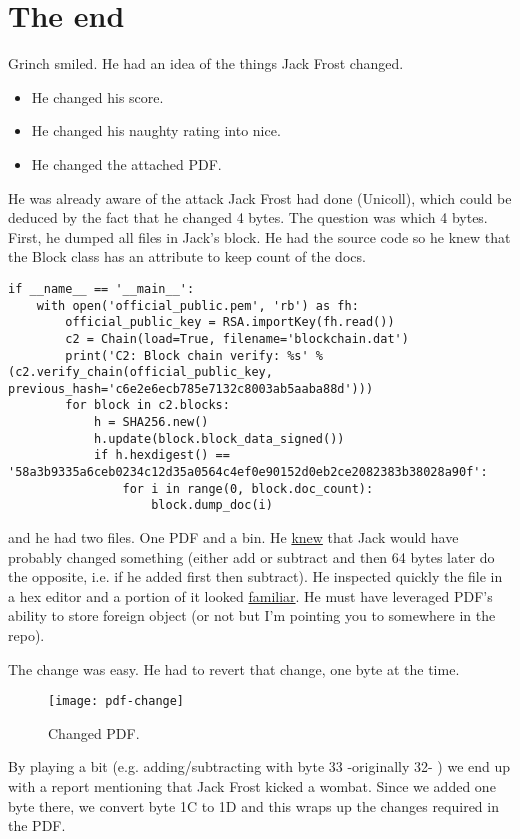 \chapter{The end}

Grinch smiled. He had an idea of the things Jack Frost changed.
\begin{itemize}
\item He changed his score.
\item He changed his naughty rating into nice.
\item He changed the attached PDF.
\end{itemize}

He was already aware of the attack Jack Frost had done (Unicoll), which could be deduced by the fact that he changed 4 bytes.
The question was which 4 bytes.
First, he dumped all files in Jack's block. He had the source code so he knew that the Block class has an attribute to keep count of the docs.
\begin{verbatim}
if __name__ == '__main__':
    with open('official_public.pem', 'rb') as fh:
        official_public_key = RSA.importKey(fh.read())
        c2 = Chain(load=True, filename='blockchain.dat')
        print('C2: Block chain verify: %s' % (c2.verify_chain(official_public_key, previous_hash='c6e2e6ecb785e7132c8003ab5aaba88d')))
        for block in c2.blocks:
            h = SHA256.new()
            h.update(block.block_data_signed())
            if h.hexdigest() == '58a3b9335a6ceb0234c12d35a0564c4ef0e90152d0eb2ce2082383b38028a90f':
                for i in range(0, block.doc_count):
                    block.dump_doc(i)
\end{verbatim}

and he had two files. One PDF and a bin. He \href{https://speakerdeck.com/ange/colltris?slide=109}{knew} that Jack would have probably changed something (either add or subtract and then 64 bytes later do the opposite, i.e. if he added first then subtract).
He inspected quickly the file in a hex editor and a portion of it looked \href{https://github.com/corkami/collisions#pdf}{familiar}.
He must have leveraged PDF's ability to store foreign object (or not but I'm pointing you to somewhere in the repo).

The change was easy. He had to revert that change, one byte at the time.
\begin{figure}[h!]
  \texttt{[image: pdf-change]}
  \caption{Changed PDF.}
\end{figure}

By playing a bit (e.g. adding/subtracting with byte 33 -originally 32- ) we end up with a report mentioning that Jack Frost kicked a wombat. Since we added one byte there, we convert byte 1C to 1D and this wraps up the changes required in the PDF.

